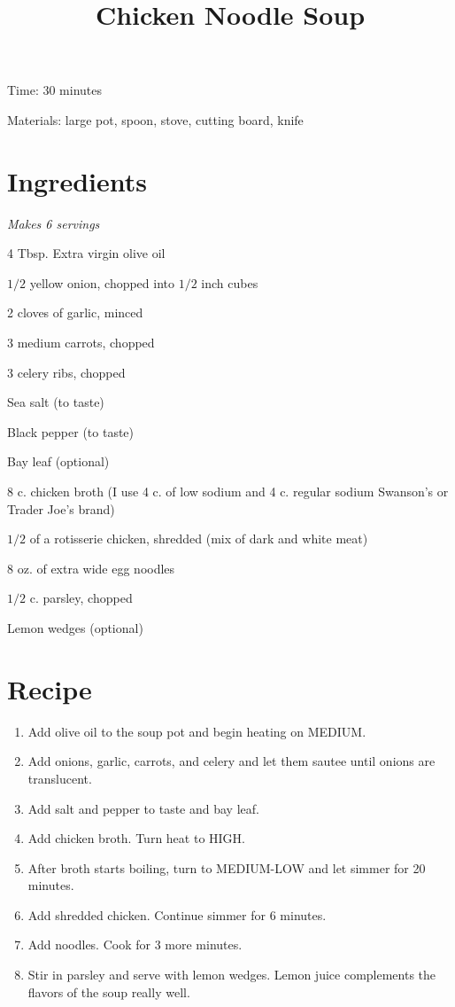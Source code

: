 \documentclass{article}
\title{Chicken Noodle Soup}
\begin{document}
Time: 30 minutes

Materials: large pot, spoon, stove, cutting board, knife

\section{Ingredients}
\textit{Makes 6 servings}

4 Tbsp. Extra virgin olive oil

$1/2$ yellow onion, chopped into $1/2$ inch cubes

2 cloves of garlic, minced

3 medium carrots, chopped

3 celery ribs, chopped

Sea salt (to taste)

Black pepper (to taste)

Bay leaf (optional)

8 c. chicken broth (I use 4 c. of low sodium and 4 c. regular sodium Swanson's or Trader Joe's brand)

$1/2$ of a rotisserie chicken, shredded (mix of dark and white meat)

8 oz. of extra wide egg noodles

$1/2$ c. parsley, chopped

Lemon wedges (optional)

\section{Recipe}
\begin{enumerate}
\item{Add olive oil to the soup pot and begin heating on MEDIUM.}
\item{Add onions, garlic, carrots, and celery and let them sautee until onions are translucent.}
\item{Add salt and pepper to taste and bay leaf.}
\item{Add chicken broth. Turn heat to HIGH.}
\item{After broth starts boiling, turn to MEDIUM-LOW and let simmer for 20 minutes.}
\item{Add shredded chicken. Continue simmer for 6 minutes.}
\item{Add noodles. Cook for 3 more minutes.}
\item{Stir in parsley and serve with lemon wedges. Lemon juice complements the flavors of the soup really well.}
\end{enumerate}
\end{document}
